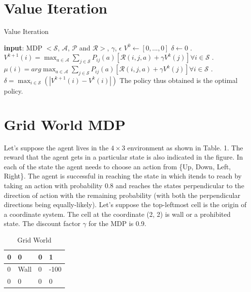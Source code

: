 \documentclass{article}
\begin{document}
\section{Value Iteration}
\begin{algorithm}[H]
    \caption{Value Iteration}\label{value_iteration}
    \begin{algorithmic}
        \State \textbf{input}: MDP $<\mathcal{S}$, $\mathcal{A}$, $\mathcal{P}$ and $\mathcal{R}>$, $\gamma$, $\epsilon$
        \State $V^{0} \gets [0,..., 0]$
        \State $\delta \gets 0$
        \While{$\delta >= \epsilon$}
            . $V^{k+1}(i) = \max_{a \in \mathcal{A}}\sum_{j \in \mathcal{S}} P_{ij}(a) [\mathcal{R}(i, j, a) + \gamma V^{k}(j)] \forall i \in \mathcal{S}$
            . $\mu(i) = arg \max_{a \in \mathcal{A}}\sum_{j \in \mathcal{S}} P_{ij}(a) [\mathcal{R}(i, j, a) + \gamma V^{k}(j)] \forall i \in \mathcal{S}$
            . $\delta = \max_{i \in \mathcal{S}}(|V^{k+1}(i) - V^{k}(i)|)$
        \EndWhile
        \State The policy thus obtained is the optimal policy.
    \end{algorithmic}
\end{algorithm}

\section{Grid World MDP}
Let's suppose the agent lives in the $4 \times 3$ environment as shown in Table. 1. The reward that the agent gets in a particular
state is also indicated in the figure. In each of the state the agent needs to choose an action from \{Up, Down, Left, Right\}. The
agent is successful in reaching the state in which itends to reach by taking an action with probability 0.8 and reaches the states
perpendicular to the direction of action with the remaining probability (with both the perpendicular directions being equally-likely).
Let's suppose the top-leftmost cell is the origin of a coordinate system. The cell at the coordinate (2, 2) is wall or a prohibited
state. The discount factor $\gamma$ for the MDP is 0.9. 

\begin{table}[H]
    \begin{center}
    \renewcommand{\arraystretch}{2}
    \begin{tabular}{ | m{1cm} | m{1cm}| m{1cm} | m{1cm} | } 
      \hline
      0 & 0 & 0 & \cellcolor{green!25}1 \\ 
      \hline
      0 & \cellcolor{gray!50}Wall & 0 & \cellcolor{red!25}-100 \\ 
      \hline
      0 & 0 & 0 & 0 \\ 
      \hline
    \end{tabular}
    \label{grid_world}
    \caption{Grid World}
    \renewcommand{\arraystretch}{1}
\end{center}
\end{table}
	
\end{document}
